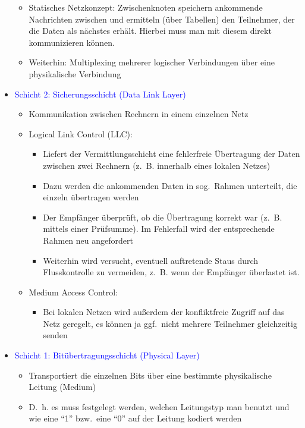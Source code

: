 \begin{itemize}
\begin{itemize}
        \item Statisches Netzkonzept: Zwischenknoten speichern ankommende Nachrichten zwischen und ermitteln (über Tabellen) den Teilnehmer, der die Daten als nächstes erhält.
        Hierbei muss man mit diesem direkt kommunizieren können.
        \item Weiterhin: Multiplexing mehrerer logischer Verbindungen über eine physikalische Verbindung
    \end{itemize}
    \item \textcolor{blue}{Schicht 2: Sicherungsschicht (Data Link Layer)}
    \begin{itemize}
        \item Kommunikation zwischen Rechnern in einem einzelnen Netz
        \item Logical Link Control (LLC):
        \begin{itemize}
            \item Liefert der Vermittlungsschicht eine fehlerfreie Übertragung der Daten zwischen zwei Rechnern (z.\ B. innerhalb eines lokalen Netzes)
            \item Dazu werden die ankommenden Daten in sog.\ Rahmen unterteilt, die einzeln übertragen werden
            \item Der Empfänger überprüft, ob die Übertragung korrekt war (z.\ B. mittels einer Prüfsumme).
            Im Fehlerfall wird der entsprechende Rahmen neu angefordert
            \item Weiterhin wird versucht, eventuell auftretende Staus durch Flusskontrolle zu vermeiden, z.\ B. wenn der Empfänger überlastet ist.
        \end{itemize}
        \item Medium Access Control:
        \begin{itemize}
            \item Bei lokalen Netzen wird außerdem der konfliktfreie Zugriff auf das Netz geregelt, es können ja ggf.\ nicht mehrere Teilnehmer gleichzeitig senden
        \end{itemize}
    \end{itemize}
    \item \textcolor{blue}{Schicht 1: Bitübertragungsschicht (Physical Layer)}
    \begin{itemize}
        \item Transportiert die einzelnen Bits über eine bestimmte physikalische Leitung (Medium)
        \item D.\ h. es muss festgelegt werden, welchen Leitungstyp man benutzt und wie eine “1” bzw.\ eine “0” auf der Leitung kodiert werden

\end{itemize}
\end{itemize}
